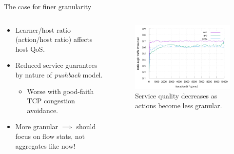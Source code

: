 \documentclass[aspectratio=169,xcolor={dvipsnames}
,hide notes
]{beamer}
\begin{document}
\begin{frame}{The case for finer granularity}
	\begin{columns}
	\begin{column}{0.45\linewidth}
		\begin{itemize}
			\item Learner/host ratio (action/host ratio) affects host QoS.
			
			\item Reduced service guarantees by nature of \emph{pushback} model.
			\begin{itemize}
				\item \alert{Worse with good-faith TCP congestion avoidance}.
			\end{itemize}
			
			\item More granular $\implies$ should focus on flow stats, \alert{not aggregates} like now! %
		\end{itemize}
	\end{column}
	\begin{column}{0.5\linewidth}
		\begin{figure}
			\includegraphics[width=\linewidth]{../plots/online-pres.pdf}
			\caption{Service quality decreases as actions become less granular.}
		\end{figure}
	\end{column}
	\end{columns}
\end{frame}
\end{document}
